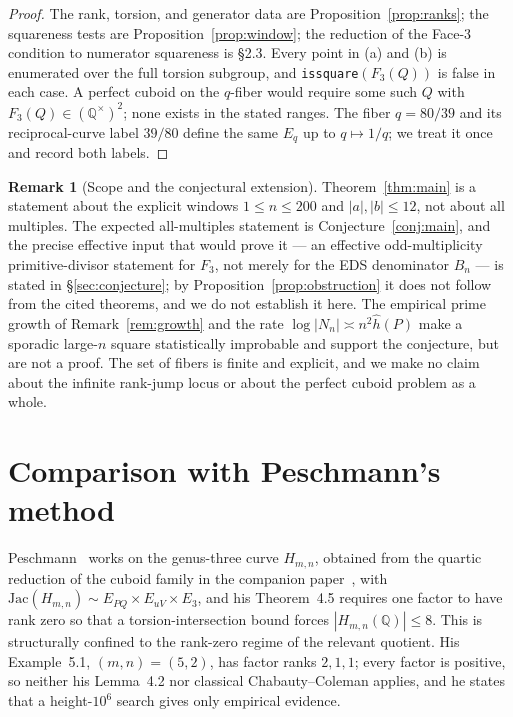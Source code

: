 \documentclass[11pt,reqno]{amsart}
\theoremstyle{plain}
\theoremstyle{definition}
\newtheorem{remark}[theorem]{Remark}
\newcommand{\Q}{\mathbb{Q}}
\newcommand{\hath}{\hat{h}}
\begin{document}
\begin{proof}
The rank, torsion, and generator data are Proposition~\ref{prop:ranks};
the squareness tests are Proposition~\ref{prop:window}; the reduction of the
Face-3 condition to numerator squareness is \S2.3. Every point in (a) and (b)
is enumerated over the full torsion subgroup, and \texttt{issquare}$(F_3(Q))$ is
false in each case. A perfect cuboid on the $q$-fiber would require some such
$Q$ with $F_3(Q)\in(\Q^\times)^2$; none exists in the stated ranges.
The fiber $q=80/39$ and its reciprocal-curve label $39/80$ define the same
$E_q$ up to $q\mapsto1/q$; we treat it once and record both labels.
\end{proof}

\begin{remark}[Scope and the conjectural extension]\label{rem:scope}
Theorem~\ref{thm:main} is a statement about the explicit windows
$1\le n\le 200$ and $|a|,|b|\le 12$, not about all multiples. The expected
all-multiples statement is Conjecture~\ref{conj:main}, and the precise effective
input that would prove it --- an effective odd-multiplicity primitive-divisor
statement for $F_3$, not merely for the EDS denominator $B_n$ --- is stated in
\S\ref{sec:conjecture}; by Proposition~\ref{prop:obstruction} it does not follow
from the cited theorems, and we do not establish it here. The empirical prime
growth of Remark~\ref{rem:growth} and the rate $\log|N_n|\asymp n^2\hath(P)$
make a sporadic large-$n$ square statistically improbable and support the
conjecture, but are not a proof. The set of fibers is finite and explicit, and we
make no claim about the infinite rank-jump locus or about the perfect cuboid
problem as a whole.
\end{remark}

\section{Comparison with Peschmann's method}

Peschmann~\cite{peschmann1} works on the genus-three curve $H_{m,n}$,
obtained from the quartic reduction of the cuboid family in the companion
paper~\cite{peschmann2}, with
$\mathrm{Jac}(H_{m,n})\sim E_{PQ}\times E_{uV}\times E_3$, and his Theorem~4.5
requires one factor to have rank zero so that a torsion-intersection bound
forces $|H_{m,n}(\Q)|\le 8$. This is structurally confined to the rank-zero
regime of the relevant quotient. His Example~5.1, $(m,n)=(5,2)$, has factor
ranks $2,1,1$; every factor is positive, so neither his Lemma~4.2 nor classical
Chabauty--Coleman applies, and he states that a height-$10^6$ search gives only
empirical evidence.
\end{document}
